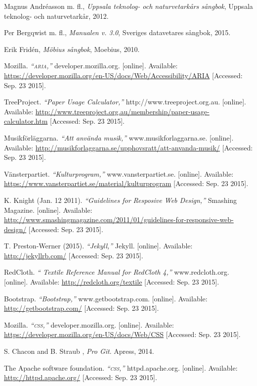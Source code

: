 \begin{thebibliography}{9}
    
    Magnus Andréasson m. fl., \emph{Uppsala teknolog- och naturvetarkårs sångbok}, Uppsala teknolog- och naturvetarkår, 2012.
    
    Per Bergqwist m. fl., \emph{Manualen v. 3.0}, Sveriges datavetares sångbok, 2015.
    
    Erik Fridén, \emph{Möbius sångbok}, Moebius, 2010.
    
    Mozilla. \emph{``\textsc{aria},''} developer.mozilla.org. [online]. Available:
    \url{https://developer.mozilla.org/en-US/docs/Web/Accessibility/ARIA}
    [Accessed: Sep. 23 2015].
    
    TreeProject. \emph{``Paper Usage Calculator,''} http://www.treeproject.org.au. [online]. Available:
    \url{http://www.treeproject.org.au/membership/paper-usage-calculator.htm}
    [Accessed: Sep. 23 2015].
    
    
    Musikförläggarna. \emph{``Att använda musik,''} www.musikforlaggarna.se. [online]. Available:
    \url{http://musikforlaggarna.se/upphovsratt/att-anvanda-musik/}
    [Accessed: Sep. 23 2015].
    
    Vänsterpartiet. \emph{``Kulturprogram,''} www.vansterpartiet.se. [online]. Available:
    \url{https://www.vansterpartiet.se/material/kulturprogram}
    [Accessed: Sep. 23 2015].
    
    K. Knight (Jan. 12 2011). \emph{``Guidelines for Resposive Web Design,''}
    Smashing Magazine. [online]. Available:
    \url{http://www.smashingmagazine.com/2011/01/guidelines-for-responsive-web-design/}
    [Accessed: Sep. 23 2015].
    
    T. Preston-Werner (2015). \emph{``Jekyll,''} Jekyll. [online]. Available:
    \url{http://jekyllrb.com/}
    [Accessed: Sep. 23 2015].
    
    RedCloth. \emph{``
        Textile Reference Manual for RedCloth 4,''} www.redcloth.org. [online]. Available:
    \url{http://redcloth.org/textile}
    [Accessed: Sep. 23 2015].

    Bootstrap. \emph{``Bootstrap,''} www.getbootstrap.com. [online]. Available:
    \url{http://getbootstrap.com/}
    [Accessed: Sep. 23 2015].

    Mozilla. \emph{``\textsc{css},''} developer.mozilla.org. [online]. Available:
    \url{https://developer.mozilla.org/en-US/docs/Web/CSS}
    [Accessed: Sep. 23 2015].
    
    S. Chacon and B. Straub , \emph{Pro Git}. Apress, 2014.
    
    The Apache software foundation. \emph{``\textsc{css},''} httpd.apache.org. [online]. Available:
    \url{http://httpd.apache.org/}
    [Accessed: Sep. 23 2015].
    
\end{thebibliography}

